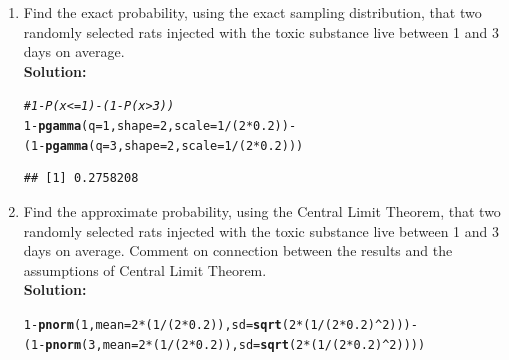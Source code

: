 \documentclass{article}\usepackage[]{graphicx}\usepackage[]{color}
\makeatletter
\newcommand{\hlnum}[1]{\textcolor[rgb]{0.686,0.059,0.569}{#1}}%
\newcommand{\hlcom}[1]{\textcolor[rgb]{0.678,0.584,0.686}{\textit{#1}}}%
\newcommand{\hlopt}[1]{\textcolor[rgb]{0,0,0}{#1}}%
\newcommand{\hlstd}[1]{\textcolor[rgb]{0.345,0.345,0.345}{#1}}%
\newcommand{\hlkwc}[1]{\textcolor[rgb]{0.333,0.667,0.333}{#1}}%
\newcommand{\hlkwd}[1]{\textcolor[rgb]{0.737,0.353,0.396}{\textbf{#1}}}%
\newenvironment{kframe}{%
 \def\at@end@of@kframe{}%
 \ifinner\ifhmode%
  \def\at@end@of@kframe{\end{minipage}}%
  \begin{minipage}{\columnwidth}%
 \fi\fi%
 \def\FrameCommand##1{\hskip\@totalleftmargin \hskip-\fboxsep
 \colorbox{shadecolor}{##1}\hskip-\fboxsep
     \hskip-\linewidth \hskip-\@totalleftmargin \hskip\columnwidth}%
 \MakeFramed {\advance\hsize-\width
   \@totalleftmargin\z@ \linewidth\hsize
   \@setminipage}}%
 {\par\unskip\endMakeFramed%
 \at@end@of@kframe}
\newenvironment{knitrout}{}{} %
\makeatother
\begin{document}
\begin{enumerate}
\begin{enumerate}
\begin{knitrout}
\begin{kframe}
\end{kframe}
\end{knitrout}
	  \item Find the exact probability, using the exact sampling distribution, that two randomly selected rats injected with the toxic substance live  between 1 and 3 days on average.\\
	  \textbf{Solution:}
\begin{knitrout}
\color{fgcolor}\begin{kframe}
\begin{alltt}
\hlcom{# 1-P(x<=1)-(1-P(x>3))}
\hlnum{1}\hlopt{-}\hlkwd{pgamma}\hlstd{(}\hlkwc{q}\hlstd{=}\hlnum{1}\hlstd{,} \hlkwc{shape}\hlstd{=}\hlnum{2}\hlstd{,} \hlkwc{scale}\hlstd{=}\hlnum{1}\hlopt{/}\hlstd{(}\hlnum{2}\hlopt{*}\hlnum{0.2}\hlstd{))}\hlopt{-}
  \hlstd{(}\hlnum{1}\hlopt{-}\hlkwd{pgamma}\hlstd{(}\hlkwc{q}\hlstd{=}\hlnum{3}\hlstd{,} \hlkwc{shape}\hlstd{=}\hlnum{2}\hlstd{,} \hlkwc{scale}\hlstd{=}\hlnum{1}\hlopt{/}\hlstd{(}\hlnum{2}\hlopt{*}\hlnum{0.2}\hlstd{)))}
\end{alltt}
\begin{verbatim}
## [1] 0.2758208
\end{verbatim}
\end{kframe}
\end{knitrout}
  \item Find the approximate probability, using the Central Limit Theorem, that two randomly 
	  selected rats injected with the toxic substance live between 1 and 3 days on average. Comment
	  on connection between the results and the assumptions of Central Limit Theorem.\\
	  \textbf{Solution:}
\begin{knitrout}
\color{fgcolor}\begin{kframe}
\begin{alltt}
\hlnum{1}\hlopt{-}\hlkwd{pnorm}\hlstd{(}\hlnum{1}\hlstd{,} \hlkwc{mean}\hlstd{=}\hlnum{2}\hlopt{*}\hlstd{(}\hlnum{1}\hlopt{/}\hlstd{(}\hlnum{2}\hlopt{*}\hlnum{0.2}\hlstd{)),} \hlkwc{sd}\hlstd{=}\hlkwd{sqrt}\hlstd{(}\hlnum{2}\hlopt{*}\hlstd{(}\hlnum{1}\hlopt{/}\hlstd{(}\hlnum{2}\hlopt{*}\hlnum{0.2}\hlstd{)}\hlopt{^}\hlnum{2}\hlstd{)))}\hlopt{-}
  \hlstd{(}\hlnum{1}\hlopt{-}\hlkwd{pnorm}\hlstd{(}\hlnum{3}\hlstd{,} \hlkwc{mean}\hlstd{=}\hlnum{2}\hlopt{*}\hlstd{(}\hlnum{1}\hlopt{/}\hlstd{(}\hlnum{2}\hlopt{*}\hlnum{0.2}\hlstd{)),} \hlkwc{sd}\hlstd{=}\hlkwd{sqrt}\hlstd{(}\hlnum{2}\hlopt{*}\hlstd{(}\hlnum{1}\hlopt{/}\hlstd{(}\hlnum{2}\hlopt{*}\hlnum{0.2}\hlstd{)}\hlopt{^}\hlnum{2}\hlstd{))))}

\end{alltt}
\end{kframe}
\end{knitrout}
\end{enumerate}
\end{enumerate}
\end{document}
